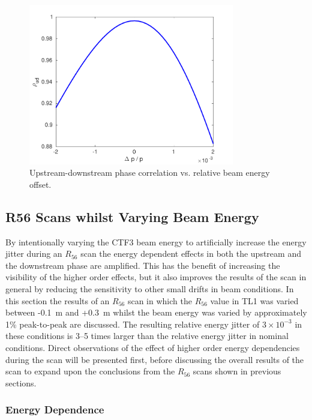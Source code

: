 \begin{figure}
  \centering
  \includegraphics[width=0.8\textwidth]{Figures/propagation/corrVsEnergyOffset}
  \caption{Upstream-downstream phase correlation vs. relative beam energy offset.}
  \label{f:corrVsEnergyOffset}
\end{figure}

\subsection{R56 Scans whilst Varying Beam Energy}
\label{ss:r56ScanWithEnergy}

By intentionally varying the CTF3 beam energy to artificially increase the energy jitter during an \(R_{56}\) scan the energy dependent effects in both the upstream and the downstream phase are amplified. This has the benefit of increasing the visibility of the higher order effects, but it also improves the results of the scan in general by reducing the sensitivity to other small drifts in beam conditions. In this section the results of an \(R_{56}\) scan in which the \(R_{56}\) value in TL1 was varied between -0.1~m and +0.3~m whilst the beam energy was varied by approximately 1\% peak-to-peak are discussed. The resulting relative energy jitter of \(3\times10^{-3}\) in these conditions is 3--5 times larger than the relative energy jitter in nominal conditions. Direct observations of the effect of higher order energy dependencies during the scan will be presented first, before discussing the overall results of the scan to expand upon the conclusions from the \(R_{56}\) scans shown in previous sections.

\subsubsection{Energy Dependence}


